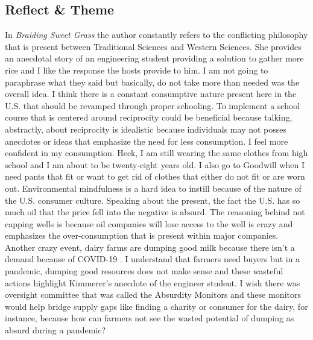 \documentclass[a4paper,man,biblatex]{apa6}
\begin{document}
\subsection{Reflect \& Theme} In \textit{Braiding Sweet Grass} the author constantly refers to the conflicting philosophy that is present between Traditional Sciences and Western Sciences. She provides an anecdotal story of an engineering student providing a solution to gather more rice and I like the response the hosts provide to him. I am not going to paraphrase what they said but basically, do not take more than needed was the overall idea. I think there is a constant consumptive nature present here in the U.S. that should be revamped through proper schooling. To implement a school course that is centered around reciprocity could be beneficial because talking, abstractly, about reciprocity is idealistic because individuals may not posses anecdotes or ideas that emphasize the need for less consumption. I feel more confident in my consumption. Heck, I am still wearing the same clothes from high school and I am about to be twenty-eight years old. I also go to Goodwill when I need pants that fit or want to get rid of clothes that either do not fit or are worn out. Environmental mindfulness is a hard idea to instill because of the nature of the U.S. consumer culture. Speaking about the present, the fact the U.S. has so much oil that the price fell into the negative is absurd. The reasoning behind not capping wells is because oil companies will lose access to the well is crazy and emphasizes the over-consumption that is present within major companies. Another crazy event, dairy farms are dumping good milk because there isn't a demand because of COVID-19 \autocite{dairyfarm}. I understand that farmers need buyers but in a pandemic, dumping good resources does not make sense and these wasteful actions highlight Kimmerer's anecdote of the engineer student. I wish there was oversight committee that was called the Absurdity Monitors and these monitors would help bridge supply gaps like finding a charity or consumer for the dairy, for instance, because how can farmers not see the wasted potential of dumping as absurd during a pandemic?
\end{document}
